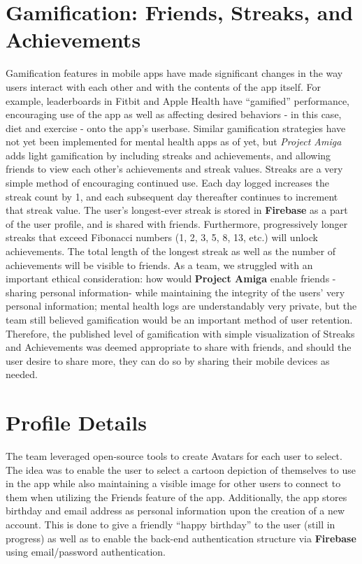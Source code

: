\documentclass[10pt,american english]{article}
\begin{document}
\section*{Gamification: Friends, Streaks, and Achievements}
Gamification features in mobile apps have made significant changes in the way users interact with each other and with the contents of the app itself. For example, leaderboards in Fitbit and Apple Health have ``gamified'' performance, encouraging use of the app as well as affecting desired behaviors - in this case, diet and exercise - onto the app's userbase. Similar gamification strategies have not yet been implemented for mental health apps as of yet, but \textit{Project Amiga} adds light gamification by including streaks and achievements, and allowing friends to view each other's achievements and streak values. 
\newline
\newline
Streaks are a very simple method of encouraging continued use. Each day logged increases the streak count by 1, and each subsequent day thereafter continues to increment that streak value. The user's longest-ever streak is stored in \textbf{Firebase} as a part of the user profile, and is shared with friends. Furthermore, progressively longer streaks that exceed Fibonacci numbers (1, 2, 3, 5, 8, 13, etc.) will unlock achievements. The total length of the longest streak as well as the number of achievements will be visible to friends. 
\newline
\newline
As a team, we struggled with an important ethical consideration: how would \textbf{Project Amiga} enable friends - sharing personal information- while maintaining the integrity of the users' very personal information; mental health logs are understandably very private, but the team still believed gamification would be an important method of user retention. Therefore, the published level of gamification with simple visualization of Streaks and Achievements was deemed appropriate to share with friends, and should the user desire to share more, they can do so by sharing their mobile devices as needed.
\section*{Profile Details}
The team leveraged open-source tools to create Avatars for each user to select. The idea was to enable the user to select a cartoon depiction of themselves to use in the app while also maintaining a visible image for other users to connect to them when utilizing the Friends feature of the app.
\newline
\newline
Additionally, the app stores birthday and email address as personal information upon the creation of a new account. This is done to give a friendly ``happy birthday'' to the user (still in progress) as well as to enable the back-end authentication structure via \textbf{Firebase} using email/password authentication.
\end{document}

